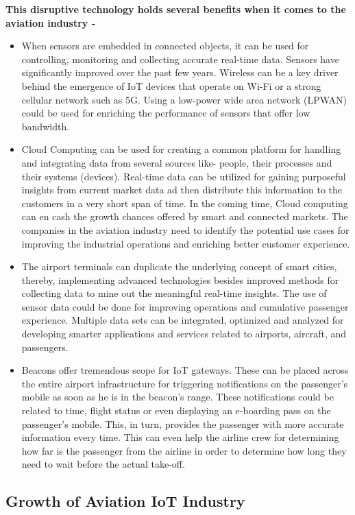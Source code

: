 \documentclass[a4paper,12pt]{article}
\begin{document}
\textbf{This disruptive technology holds several benefits when it comes to the aviation industry -}

\begin{itemize}
\item{ When sensors are embedded in connected objects, it can be used for controlling, monitoring and collecting accurate real-time data. Sensors have significantly improved over the past few years. Wireless can be a key driver behind the emergence of IoT devices that operate on Wi-Fi or a strong cellular network such as 5G. Using a low-power wide area network (LPWAN) could be used for enriching the performance of sensors that offer low bandwidth.}
\item{ Cloud Computing can be used for creating a common platform for handling and integrating data from several sources like- people, their processes and their systems (devices). Real-time data can be utilized for gaining purposeful insights from current market data ad then distribute this information to the customers in a very short span of time. In the coming time, Cloud computing can en cash the growth chances offered by smart and connected markets. The companies in the aviation industry need to identify the potential use cases for improving the industrial operations and enriching better customer experience.}
\item{ The airport terminals can duplicate the underlying concept of smart cities, thereby, implementing advanced technologies besides improved methods for collecting data to mine out the meaningful real-time insights. The use of sensor data could be done for improving operations and cumulative passenger experience. Multiple data sets can be integrated, optimized and analyzed for developing smarter applications and services related to airports, aircraft, and passengers.}
\item{ Beacons offer tremendous scope for IoT gateways. These can be placed across the entire airport infrastructure for triggering notifications on the passenger’s mobile as soon as he is in the beacon’s range. These notifications could be related to time, flight status or even displaying an e-boarding pass on the passenger’s mobile. This, in turn, provides the passenger with more accurate information every time. This can even help the airline crew for determining how far is the passenger from the airline in order to determine how long they need to wait before the actual take-off.}
\end{itemize}

\subsection{Growth of Aviation IoT Industry}
\end{document}
